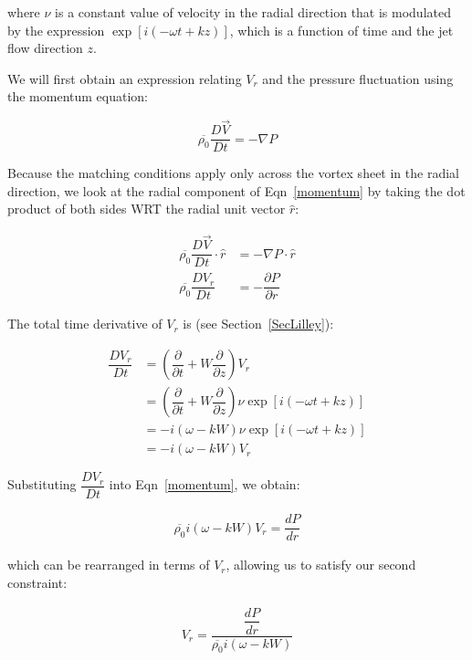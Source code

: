 \documentclass[]{aiaa-tc}%
\begin{document}
\noindent where $\nu$ is a constant value of velocity in the radial direction that is modulated by the expression $\exp[i(-\omega t + kz)]$, which is a function of time and the jet flow direction $z$.

We will first obtain an expression relating $V_r$ and the pressure fluctuation using the momentum equation:

\begin{equation} \label{momentum}
\overline{\rho_0} \dfrac{D\vec{V} }{Dt} = - \nabla P
\end{equation}

Because the matching conditions apply only across the vortex sheet in the radial direction, we look at the radial component of Eqn~\ref{momentum} by taking the dot product of both sides WRT the radial unit vector $\hat{r}$:

\begin{align*}
\overline{\rho_0} \dfrac{D\vec{V}}{Dt} \cdot \hat{r}
    &= - \nabla P \cdot \hat{r} \\
\overline{\rho_0} \dfrac{D V_r}{Dt} &= - \dfrac{\partial P}{\partial r}
\end{align*}

The total time derivative of $V_r$ is (see Section~\ref{SecLilley}):

\begin{align*}
\dfrac{D V_r}{Dt}
  &= \left(\dfrac{\partial}{\partial t} + W \dfrac{\partial}{\partial z}\right)
  V_r \\
  &= \left(\dfrac{\partial}{\partial t} + W \dfrac{\partial}{\partial z}\right)
  \nu \exp[i(-\omega t + kz)] \\
  &= - i( \omega - kW ) \nu\exp[i(-\omega t + kz)] \\
  &= - i( \omega - kW ) V_r
\end{align*}

Substituting $\dfrac{D V_r}{Dt}$ into Eqn~\ref{momentum}, we obtain:

\begin{align}
\overline{\rho_0} i( \omega - kW ) V_r = \dfrac{d P}{d r}
\end{align}

\noindent which can be rearranged in terms of $V_r$, allowing us to satisfy our second constraint:

\begin{align} \label{VrMomentum}
\boxed{V_r = \dfrac{\dfrac{d P}{d r}}{\overline{\rho_0} i( \omega - kW )}}
\end{align}
\end{document}
